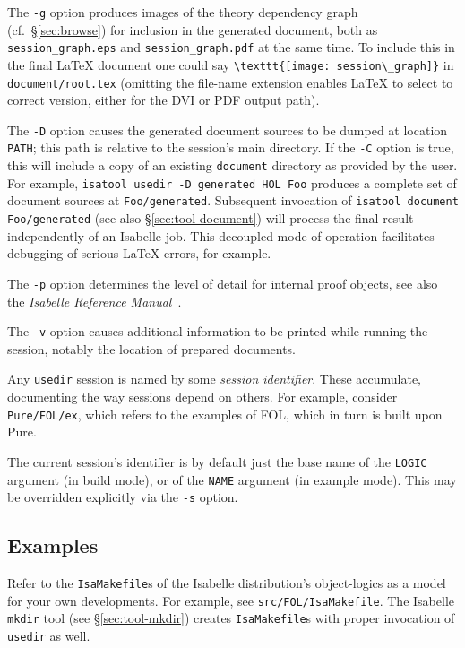 \medskip The \texttt{-g} option produces images of the theory dependency graph
(cf.\ \S\ref{sec:browse}) for inclusion in the generated document, both as
\texttt{session_graph.eps} and \texttt{session_graph.pdf} at the same time.
To include this in the final {\LaTeX} document one could say
\verb,\texttt{[image: session\_graph]}, in \texttt{document/root.tex} (omitting
the file-name extension enables {\LaTeX} to select to correct version, either
for the DVI or PDF output path).

\medskip The \texttt{-D} option causes the generated document sources to be
dumped at location \texttt{PATH}; this path is relative to the session's main
directory.  If the \texttt{-C} option is true, this will include a copy of an
existing \texttt{document} directory as provided by the user.  For example,
\texttt{isatool usedir -D generated HOL Foo} produces a complete set of
document sources at \texttt{Foo/generated}.  Subsequent invocation of
\texttt{isatool document Foo/generated} (see also \S\ref{sec:tool-document})
will process the final result independently of an Isabelle job.  This
decoupled mode of operation facilitates debugging of serious {\LaTeX} errors,
for example.

\medskip The \texttt{-p} option determines the level of detail for internal
proof objects, see also the \emph{Isabelle Reference
  Manual}~\cite{isabelle-ref}.

\medskip The \texttt{-v} option causes additional information to be printed
while running the session, notably the location of prepared documents.

\medskip Any \texttt{usedir} session is named by some \emph{session
  identifier}. These accumulate, documenting the way sessions depend on
others. For example, consider \texttt{Pure/FOL/ex}, which refers to the
examples of FOL, which in turn is built upon Pure.

The current session's identifier is by default just the base name of the
\texttt{LOGIC} argument (in build mode), or of the \texttt{NAME} argument (in
example mode). This may be overridden explicitly via the \texttt{-s} option.


\subsection*{Examples}

Refer to the \texttt{IsaMakefile}s of the Isabelle distribution's
object-logics as a model for your own developments.  For example, see
\texttt{src/FOL/IsaMakefile}.  The Isabelle \texttt{mkdir} tool (see
\S\ref{sec:tool-mkdir}) creates \texttt{IsaMakefile}s with proper invocation
of \texttt{usedir} as well.


